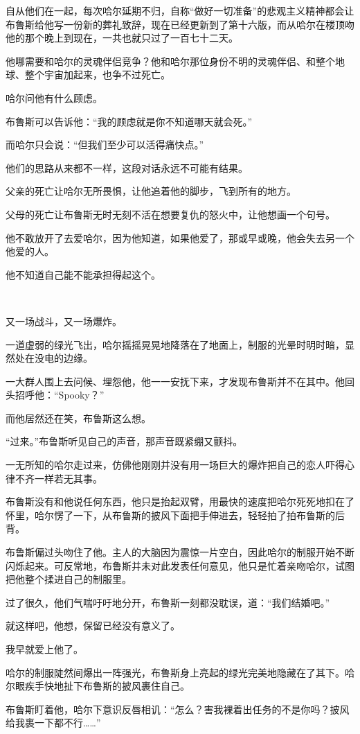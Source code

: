 \documentclass[../main.tex]{subfiles}
\begin{document}
自从他们在一起，每次哈尔延期不归，自称“做好一切准备”的悲观主义精神都会让布鲁斯给他写一份新的葬礼致辞，现在已经更新到了第十六版，而从哈尔在楼顶吻他的那个晚上到现在，一共也就只过了一百七十二天。

他哪需要和哈尔的灵魂伴侣竞争？他和哈尔那位身份不明的灵魂伴侣、和整个地球、整个宇宙加起来，也争不过死亡。

哈尔问他有什么顾虑。

布鲁斯可以告诉他：“我的顾虑就是你不知道哪天就会死。”

而哈尔只会说：“但我们至少可以活得痛快点。”

他们的思路从来都不一样，这段对话永远不可能有结果。

父亲的死亡让哈尔无所畏惧，让他追着他的脚步，飞到所有的地方。

父母的死亡让布鲁斯无时无刻不活在想要复仇的怒火中，让他想画一个句号。

他不敢放开了去爱哈尔，因为他知道，如果他爱了，那或早或晚，他会失去另一个他爱的人。

他不知道自己能不能承担得起这个。

~\

又一场战斗，又一场爆炸。

一道虚弱的绿光飞出，哈尔摇摇晃晃地降落在了地面上，制服的光晕时明时暗，显然处在没电的边缘。

一大群人围上去问候、埋怨他，他一一安抚下来，才发现布鲁斯并不在其中。他回头招呼他：“Spooky？”

而他居然还在笑，布鲁斯这么想。

“过来。”布鲁斯听见自己的声音，那声音既紧绷又颤抖。

一无所知的哈尔走过来，仿佛他刚刚并没有用一场巨大的爆炸把自己的恋人吓得心律不齐一样若无其事。

布鲁斯没有和他说任何东西，他只是抬起双臂，用最快的速度把哈尔死死地扣在了怀里，哈尔愣了一下，从布鲁斯的披风下面把手伸进去，轻轻拍了拍布鲁斯的后背。

布鲁斯偏过头吻住了他。主人的大脑因为震惊一片空白，因此哈尔的制服开始不断闪烁起来。可反常地，布鲁斯并未对此发表任何意见，他只是忙着亲吻哈尔，试图把他整个揉进自己的制服里。

过了很久，他们气喘吁吁地分开，布鲁斯一刻都没耽误，道：“我们结婚吧。”

就这样吧，他想，保留已经没有意义了。

我早就爱上他了。

哈尔的制服陡然间爆出一阵强光，布鲁斯身上亮起的绿光完美地隐藏在了其下。哈尔眼疾手快地扯下布鲁斯的披风裹住自己。

布鲁斯盯着他，哈尔下意识反唇相讥：“怎么？害我裸着出任务的不是你吗？披风给我裹一下都不行……”
\end{document}
